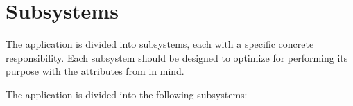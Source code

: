 \section{Subsystems}
\label{sec:subsystems}
The application is divided into subsystems, each with a specific concrete responsibility.
Each subsystem should be designed to optimize for performing its purpose with the attributes from  in mind.

The application is divided into the following subsystems:


% 






